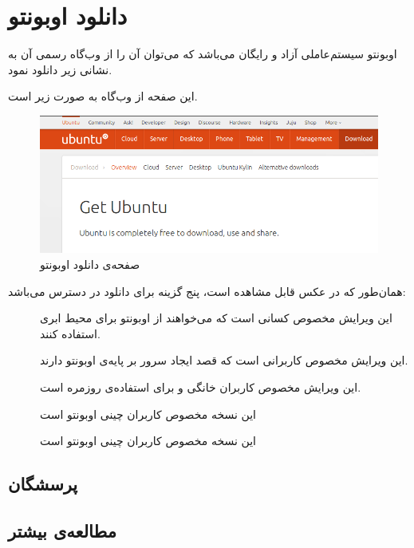 \chapter{دانلود اوبونتو}
اوبونتو سیستم‌عاملی آزاد و رایگان می‌باشد که می‌توان آن را از وب‌گاه رسمی آن به نشانی زیر دانلود نمود.

\begin{url-address}

\end{url-address}
 این صفحه از وب‌گاه به صورت زیر است.
\begin{figure}[hbtp]
\centering
\includegraphics[scale=0.5]{pics/ubuntu-download.png}
\caption{صفحه‌ی دانلود اوبونتو}
\label{fig:ubuntu-download}
\end{figure}

همان‌طور که در عکس قابل مشاهده است، پنج گزینه برای دانلود در دسترس می‌باشد:
\begin{description}
\item[] این ویرایش مخصوص کسانی است که می‌خواهند از اوبونتو برای محیط ابری استفاده کنند.
\item[] این ویرایش مخصوص کاربرانی است که قصد ایجاد سرور بر پایه‌ی اوبونتو دارند.
\item[] این ویرایش مخصوص کاربران خانگی و برای استفاده‌ی روزمره است.
\item[] این نسخه مخصوص کاربران چینی اوبونتو است
\item[] این نسخه مخصوص کاربران چینی اوبونتو است
\end{description}

\section{پرسشگان}
\section{مطالعه‌ی بیشتر}
